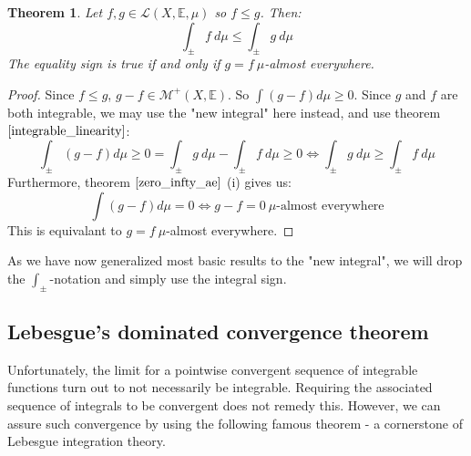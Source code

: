 \documentclass[12pt, a4paper]{article}
\newtheorem{theorem}{Theorem}[section]
\numberwithin{equation}{section}
\begin{document}
\begin{theorem}
Let $f,g\in\mathcal{L}(X,\mathbb{E},\mu)$ so $f\le g$. Then:
\begin{equation}
\int_\pm f\ d\mu\le\int_\pm g\ d\mu
\end{equation}
The equality sign is true if and only if $g=f\ \mu$-almost everywhere.
\end{theorem}
\begin{proof}
Since $f\le g$, $g-f\in\mathcal{M}^+(X,\mathbb{E})$. So $\int(g-f)d\mu\ge 0$. Since $g$ and $f$ are both integrable, we may use the "new integral" here instead, and use theorem $\ref{integrable_linearity}$:
\begin{equation}
\int_\pm(g-f)d\mu\ge 0=\int_\pm g\ d\mu-\int_\pm f\ d\mu\ge 0\Leftrightarrow\int_\pm g\ d\mu\ge\int_\pm f\ d\mu
\end{equation}
Furthermore, theorem $\ref{zero_infty_ae}$ (i) gives us:
\begin{equation}
\int(g-f)d\mu=0\Leftrightarrow g-f=0\ \mu\textrm{-almost everywhere}
\end{equation}
This is equivalant to $g=f\ \mu$-almost everywhere.
\end{proof}

As we have now generalized most basic results to the "new integral", we will drop the $\int_\pm$-notation and simply use the integral sign.

\subsection{Lebesgue's dominated convergence theorem}
Unfortunately, the limit for a pointwise convergent sequence of integrable functions turn out to not necessarily be integrable. Requiring the associated sequence of integrals to be convergent does not remedy this. However, we can assure such convergence by using the following famous theorem - a cornerstone of Lebesgue integration theory.
\end{document}

